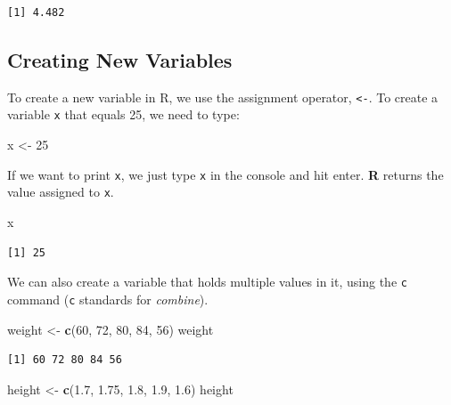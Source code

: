 \documentclass[]{book}
\newenvironment{Shaded}{\begin{snugshade}}{\end{snugshade}}
\newcommand{\DecValTok}[1]{\textcolor[rgb]{0.00,0.00,0.81}{#1}}
\newcommand{\FloatTok}[1]{\textcolor[rgb]{0.00,0.00,0.81}{#1}}
\newcommand{\KeywordTok}[1]{\textcolor[rgb]{0.13,0.29,0.53}{\textbf{#1}}}
\newcommand{\NormalTok}[1]{#1}
\newcommand{\StringTok}[1]{\textcolor[rgb]{0.31,0.60,0.02}{#1}}
\begin{document}
\begin{verbatim}
[1] 4.482
\end{verbatim}

\hypertarget{creating-new-variables}{%
\subsection{Creating New Variables}\label{creating-new-variables}}

To create a new variable in R, we use the assignment operator, \texttt{\textless{}-}. To create a variable \texttt{x} that equals 25, we need to type:

\begin{Shaded}
\begin{Highlighting}[]
\NormalTok{x <-}\StringTok{ }\DecValTok{25}
\end{Highlighting}
\end{Shaded}

If we want to print \texttt{x}, we just type \texttt{x} in the console and hit enter. \textbf{R} returns the value assigned to \texttt{x}.

\begin{Shaded}
\begin{Highlighting}[]
\NormalTok{x}
\end{Highlighting}
\end{Shaded}

\begin{verbatim}
[1] 25
\end{verbatim}

We can also create a variable that holds multiple values in it, using the \texttt{c} command (\texttt{c} standards for \emph{combine}).

\begin{Shaded}
\begin{Highlighting}[]
\NormalTok{weight <-}\StringTok{ }\KeywordTok{c}\NormalTok{(}\DecValTok{60}\NormalTok{, }\DecValTok{72}\NormalTok{, }\DecValTok{80}\NormalTok{, }\DecValTok{84}\NormalTok{, }\DecValTok{56}\NormalTok{)}
\NormalTok{weight}
\end{Highlighting}
\end{Shaded}

\begin{verbatim}
[1] 60 72 80 84 56
\end{verbatim}

\begin{Shaded}
\begin{Highlighting}[]
\NormalTok{height <-}\StringTok{ }\KeywordTok{c}\NormalTok{(}\FloatTok{1.7}\NormalTok{, }\FloatTok{1.75}\NormalTok{, }\FloatTok{1.8}\NormalTok{, }\FloatTok{1.9}\NormalTok{, }\FloatTok{1.6}\NormalTok{)}
\NormalTok{height}
\end{Highlighting}
\end{Shaded}
\end{document}
